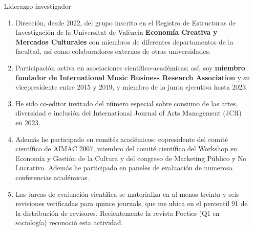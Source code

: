 \documentclass[
  8pt,
  ignorenonframetext,
  aspectratio=169,
  spanish,
]{beamer}
\begin{document}
\begin{frame}{Liderazgo investigador}
{\begin{enumerate}
\item
  Dirección, desde 2022, del grupo inscrito en el Registro de
  Estructuras de Investigación de la Universitat de València
  \textbf{Economía Creativa y Mercados Culturales} con miembros de
  diferentes departamentos de la facultad, así como colaboradores
  externos de otras universidades.
\item
  Participación activa en asociaciones científico-académicas; así, soy
  \textbf{miembro fundador de International Music Business Research
  Association} y su vicepresidente entre 2015 y 2019, y miembro de la
  junta ejecutiva hasta 2023.
\item
  He sido co-editor invitado del número especial sobre consumo de las
  artes, diversidad e inclusión del International Journal of Arts
  Management (JCR) en 2023.
\item
  Además he participado en comités académicos: copresidente del comité
  científico de AIMAC 2007, miembro del comité científico del Workshop
  en Economía y Gestión de la Cultura y del congreso de Marketing
  Público y No Lucrativo. Además he participado en paneles de evaluación
  de numerosa conferencias académicas.
\item
  Las tareas de evaluación científica se materializa en al menos treinta
  y seis revisiones verificadas para quince journals, que me ubica en el
  percentil 91 de la distribución de revisores. Recientemente la revista
  Poetics (Q1 en sociología) reconoció esta actividad.
\end{enumerate}}
\end{frame}
\end{document}
